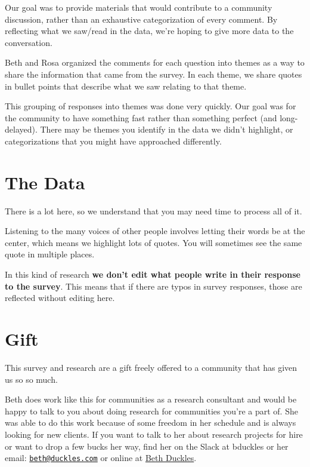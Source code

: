 \documentclass[
]{book}
\begin{document}
Our goal was to provide materials that would contribute to a community discussion, rather than an exhaustive categorization of every comment. By reflecting what we saw/read in the data, we're hoping to give more data to the conversation.

Beth and Rosa organized the comments for each question into themes as a way to share the information that came from the survey. In each theme, we share quotes in bullet points that describe what we saw relating to that theme.

This grouping of responses into themes was done very quickly. Our goal was for the community to have something fast rather than something perfect (and long-delayed). There may be themes you identify in the data we didn't highlight, or categorizations that you might have approached differently.

\section{The Data}\label{the-data}

There is a lot here, so we understand that you may need time to process all of it.

Listening to the many voices of other people involves letting their words be at the center, which means we highlight lots of quotes. You will sometimes see the same quote in multiple places.

In this kind of research \textbf{we don't edit what people write in their response to the survey}. This means that if there are typos in survey responses, those are reflected without editing here.

\section{Gift}\label{gift}

This survey and research are a gift freely offered to a community that has given us so so much.

Beth does work like this for communities as a research consultant and would be happy to talk to you about doing research for communities you're a part of. She was able to do this work because of some freedom in her schedule and is always looking for new clients. If you want to talk to her about research projects for hire or want to drop a few bucks her way, find her on the Slack at bduckles or her email: \href{mailto:beth@duckles.com}{\nolinkurl{beth@duckles.com}} or online at \href{https://bethduckles.com/}{Beth Duckles}.
\end{document}
